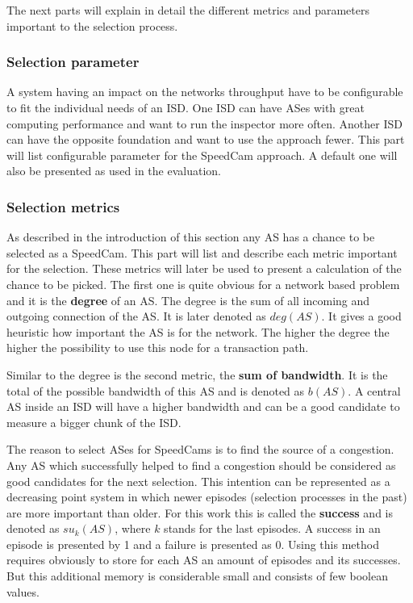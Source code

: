 \documentclass[thesis.tex]{subfiles}
\begin{document}
The next parts will explain in detail the different metrics and parameters important to the selection process.

\subsubsection{Selection parameter}

A system having an impact on the networks throughput have to be configurable to fit the individual needs of an ISD. One ISD can have ASes with great computing performance and want to run the inspector more often. Another ISD can have the opposite foundation and want to use the approach fewer. This part will list configurable parameter for the SpeedCam approach. A default one will also be presented as used in the evaluation.



\subsubsection{Selection metrics}

As described in the introduction of this section any AS has a chance to be selected as a SpeedCam. This part will list and describe each metric important for the selection. These metrics will later be used to present a calculation of the chance to be picked.
The first one is quite obvious for a network based problem and it is the \textbf{degree} of an AS. The degree is the sum of all incoming and outgoing connection of the AS. It is later denoted as $deg(AS)$. It gives a good heuristic how important the AS is for the network. The higher the degree the higher the possibility to use this node for a transaction path.

Similar to the degree is the second metric, the \textbf{sum of bandwidth}. It is the total of the possible bandwidth of this AS and is denoted as $b(AS)$. A central AS inside an ISD will have a higher bandwidth and can be a good candidate to measure a bigger chunk of the ISD.

The reason to select ASes for SpeedCams is to find the source of a congestion. Any AS which successfully helped to find a congestion should be considered as good candidates for the next selection. This intention can be represented as a decreasing point system in which newer episodes (selection processes in the past) are more important than older. For this work this is called the \textbf{success} and is denoted as $su_{k}(AS)$, where $k$ stands for the last episodes. A success in an episode is presented by 1 and a failure is presented as 0. Using this method requires obviously to store for each AS an amount of episodes and its successes. But this additional memory is considerable small and consists of few boolean values.
\end{document}
